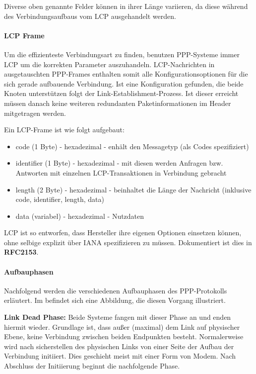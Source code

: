 Diverse oben genannte Felder können in ihrer Länge variieren, da 
diese während des Verbindungsaufbaus vom \ac{LCP} ausgehandelt werden.

\paragraph{LCP Frame} Um die effizienteste Verbindungsart zu finden, benutzen PPP-Systeme
immer \ac{LCP} um die korrekten Parameter auszuhandeln. LCP-Nachrichten in ausgetauschten
PPP-Frames enthalten somit alle Konfigurationsoptionen für die sich gerade aufbauende
Verbindung. Ist eine Konfiguration gefunden, die beide Knoten unterstützen folgt der
Link-Establishment-Prozess. Ist dieser erreicht müssen danach keine weiteren redundanten
Paketinformationen im Header mitgetragen werden.

Ein LCP-Frame ist wie folgt aufgebaut:
\begin{itemize}
	\item code (1 Byte) - hexadezimal - enhält den Messagetyp (als Codes spezifiziert)
	\item identifier (1 Byte) - hexadezimal - mit diesen werden Anfragen bzw. Antworten mit einzelnen LCP-Transaktionen in Verbindung gebracht
	\item length (2 Byte) - hexadezimal - beinhaltet die Länge der Nachricht (inklusive code, identifier, length, data)
	\item data (variabel) - hexadezimal - Nutzdaten
\end{itemize}

\ac{LCP} ist so entworfen, dass Hersteller ihre eigenen Optionen einsetzen können, ohne
selbige explizit über \ac{IANA} spezifizieren zu müssen. Dokumentiert ist dies in \textbf{RFC2153}.

\paragraph{Aufbauphasen} Nachfolgend werden die verschiedenen Aufbauphasen des
PPP-Protokolls erläutert. Im  befindet
sich eine Abbildung, die diesen Vorgang illustriert.

\textbf{Link Dead Phase:}
Beide Systeme fangen mit dieser Phase an und enden hiermit wieder.
Grundlage ist, dass außer (maximal) dem Link auf physischer Ebene,
keine Verbindung zwischen beiden Endpunkten besteht. Normalerweise
wird nach sicherstellen des physischen Links von einer Seite der
Aufbau der Verbindung initiiert. Dies geschieht meist mit einer Form von Modem.
Nach Abschluss der Initiierung beginnt die nachfolgende Phase.

